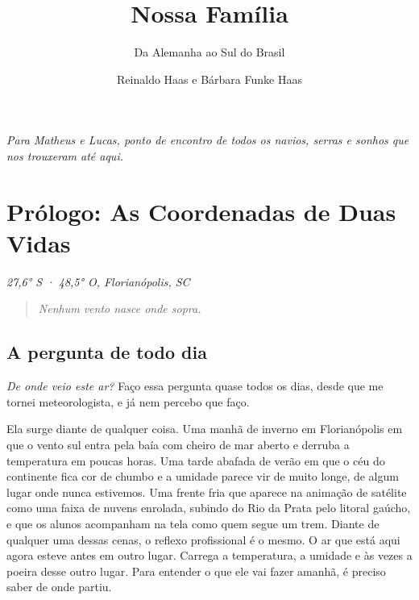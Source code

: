 \documentclass[
  brazilian,
  11pt,
  openany]{book}
\title{Nossa Família}
\subtitle{Da Alemanha ao Sul do Brasil}
\author{Reinaldo Haas e Bárbara Funke Haas}
\date{}
\begin{document}
\frontmatter
\maketitle

\frontmatter
\thispagestyle{empty}\vspace*{0.3\textheight}
\begin{flushright}\itshape Para Matheus e Lucas, ponto de encontro de todos os navios, serras e sonhos que nos trouxeram até aqui.\end{flushright}
\cleardoublepage\tableofcontents
\cleardoublepage\listoffigures
\mainmatter

\mainmatter
\chapter*{Prólogo: As Coordenadas de Duas Vidas}\label{prologo}

\emph{27,6° S · 48,5° O, Florianópolis, SC}

\begin{quote}
\emph{Nenhum vento nasce onde sopra.}
\end{quote}

\section{A pergunta de todo dia}\label{a-pergunta-de-todo-dia}

\emph{De onde veio este ar?} Faço essa pergunta quase todos os dias,
desde que me tornei meteorologista, e já nem percebo que faço.

Ela surge diante de qualquer coisa. Uma manhã de inverno em
Florianópolis em que o vento sul entra pela baía com cheiro de mar
aberto e derruba a temperatura em poucas horas. Uma tarde abafada de
verão em que o céu do continente fica cor de chumbo e a umidade parece
vir de muito longe, de algum lugar onde nunca estivemos. Uma frente fria
que aparece na animação de satélite como uma faixa de nuvens enrolada,
subindo do Rio da Prata pelo litoral gaúcho, e que os alunos acompanham
na tela como quem segue um trem. Diante de qualquer uma dessas cenas, o
reflexo profissional é o mesmo. O ar que está aqui agora esteve antes em
outro lugar. Carrega a temperatura, a umidade e às vezes a poeira desse
outro lugar. Para entender o que ele vai fazer amanhã, é preciso saber
de onde partiu.
\end{document}
